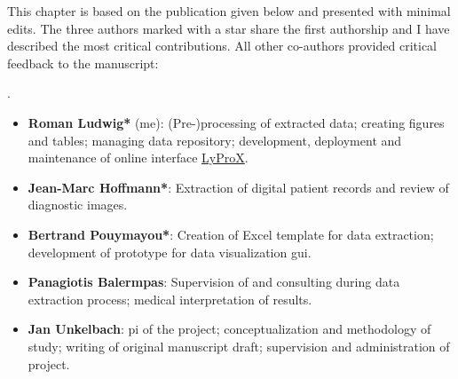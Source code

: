 \begin{tcolorbox}[
    title=\faIcon{users} Contributions,
    parbox=false,
    float
]
    This chapter is based on the publication given below and presented with minimal edits. The three authors marked with a star share the first authorship and I have described the most critical contributions. All other co-authors provided critical feedback to the manuscript:
    
    .

    \begin{itemize}[leftmargin=5.5mm]
        \item[\faIcon{user}] \textbf{Roman Ludwig*} (me): (Pre-)processing of extracted data; creating figures and tables; managing data repository; development, deployment and maintenance of online interface \href{https://lyprox.org}{ LyProX}.
        \item[\faIcon{user}] \textbf{Jean-Marc Hoffmann*}: Extraction of digital patient records and review of diagnostic images.
        \item[\faIcon{user}] \textbf{Bertrand Pouymayou*}: Creation of Excel template for data extraction; development of prototype for data visualization \acrshort{gui}.
        \item[\faIcon{user}] \textbf{Panagiotis Balermpas}: Supervision of and consulting during data extraction process; medical interpretation of results.
        \item[\faIcon{user}] \textbf{Jan Unkelbach}: \Gls{pi} of the project; conceptualization and methodology of study; writing of original manuscript draft; supervision and administration of project.
    \end{itemize}
\end{tcolorbox}

